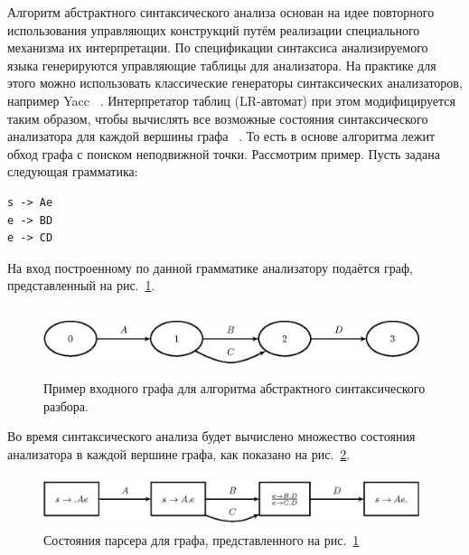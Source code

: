 \documentclass[a5paper]{article}
\begin{document}
Алгоритм абстрактного синтаксического анализа основан на идее повторного использования управляющих конструкций путём реализации специального механизма их интерпретации. По спецификации синтаксиса анализируемого языка генерируются управляющие таблицы для анализатора. На практике для этого можно использовать классические генераторы синтаксических анализаторов, например Yacc ~\cite{Yacc}. Интерпретатор таблиц (LR-автомат) при этом модифицируется таким образом, чтобы вычислять все возможные состояния синтаксического анализатора для каждой вершины графа ~\cite{ALVOR2}. То есть в основе алгоритма лежит обход графа с поиском неподвижной точки.
Рассмотрим пример. Пусть задана следующая грамматика:

\begin{verbatim}
s -> Ae
e -> BD
e -> CD
\end{verbatim}

На вход построенному по данной грамматике анализатору подаётся граф, представленный на рис.~\ref{pic2}.

\begin{figure}
    \begin{center}
        \includegraphics[width=11cm,height=2cm]{graphs/simple_grammar_inpt.eps}
        \caption{Пример входного графа для алгоритма абстрактного синтаксического разбора.}
        \label{pic2}
    \end{center}
\end{figure}

Во время синтаксического анализа будет вычислено множество состояния анализатора в каждой вершине графа, как показано на рис.~\ref{pic3}.

\begin{figure}
    \begin{center}
        \includegraphics[width=11cm,height=1.5cm]{graphs/simple_grammar_items.eps}
        \caption{Состояния парсера для графа, представленного на рис.~\ref{pic2}}
        \label{pic3}
    \end{center}
\end{figure}
\end{document}
